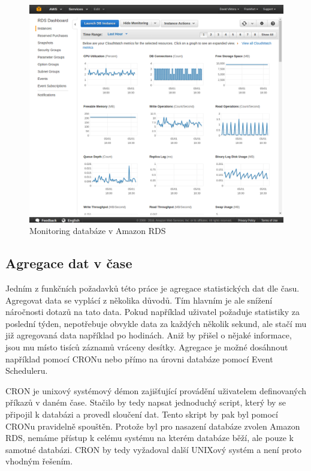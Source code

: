 \documentclass[thesis=B,czech]{FITthesis}[2012/06/26]
\begin{document}
\begin{figure}[h]
   	\centering
   	\includegraphics[width=1\textwidth]{images/aws-monitoring.png}
   	\caption{Monitoring databáze v Amazon RDS}
   	\label{fig:aws_monitoring}
\end{figure}
	
\subsection{Agregace dat v čase}
\label{agregace-dat}
	Jedním z funkčních požadavků této práce je agregace statistických dat dle času. Agregovat data se vyplácí z několika důvodů. Tím hlavním je ale snížení náročnosti dotazů na tato data. Pokud například uživatel požaduje statistiky za poslední týden, nepotřebuje obvykle data za každých několik sekund, ale stačí mu již agregovaná data například po hodinách. Aniž by přišel o nějaké informace, jsou mu místo tisíců záznamů vráceny desítky. Agregace je možné dosáhnout například pomocí CRONu nebo přímo na úrovni databáze pomocí Event Scheduleru. 
	
	CRON je unixový systémový démon zajišťující provádění uživatelem definovaných příkazů v daném čase. Stačilo by tedy napsat jednoduchý script, který by se připojil k databázi a provedl sloučení dat. Tento skript by pak byl pomocí CRONu pravidelně spouštěn. Protože byl pro nasazení databáze zvolen Amazon RDS, nemáme přístup k celému systému na kterém databáze běží, ale pouze k samotné databázi. CRON by tedy vyžadoval další UNIXový systém a není proto vhodným řešením. 
	
\end{document}
